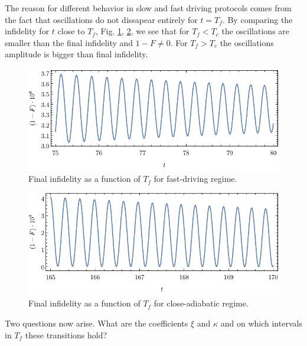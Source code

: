 The reason for different behavior in slow and fast driving protocols comes from the fact that oscillations do not dissapear entirely for $t=T_f$. By comparing the infidelity for $t$ close to $T_f$, Fig. \ref{fig:undercritical}, \ref{fig:overcritical}, we see that for $T_f<T_c$ the oscillations are smaller than the final infidelity and $1-F\neq 0$. For $T_f>T_c$ the oscillations amplitude is bigger than final infidelity.

\begin{figure}[H]
    \centering
    \includegraphics[scale=1.2]{../img/undercritical.pdf}
    \caption{Final infidelity as a function of $T_f$ for fast-driving regime.}
    \label{fig:undercritical}
\end{figure}

\begin{figure}[H]
    \centering
    \includegraphics[scale=1.2]{../img/overcritical.pdf}
    \caption{Final infidelity as a function of $T_f$ for close-adiabatic regime.}
    \label{fig:overcritical}
\end{figure}

Two questions now arise. What are the coefficients $\xi$ and $\kappa$ and on which intervals in $T_f$ these transitions hold? 

